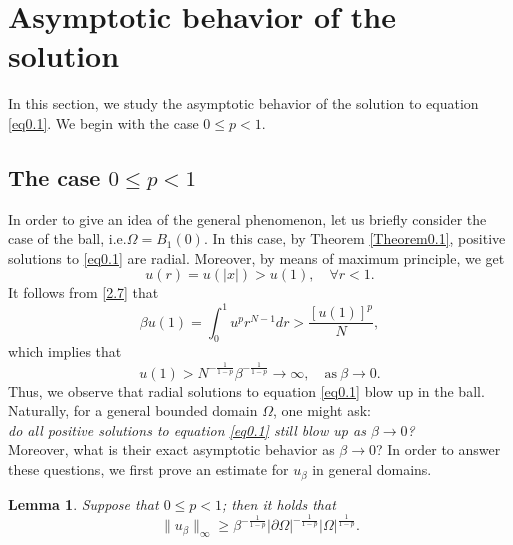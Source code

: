 \documentclass[12pt,reqno]{amsart}
\numberwithin{equation}{section}
\newtheorem{lemma}[theorem]{Lemma}
\theoremstyle{definition}
\begin{document}
\section{Asymptotic behavior of the solution}
In this section, we study the asymptotic behavior of the solution to equation \eqref{eq0.1}. We begin with the case $0\le p<1$.

\subsection{The case $0\le p<1$}



In order to give an idea of the general phenomenon, let us briefly consider the case of the ball, i.e.$\Omega=B_1(0)$. 
 In this case, by Theorem \ref{Theorem0.1},  positive solutions to  \eqref{eq0.1} are  radial. 
Moreover, by means of maximum principle, we get 
$$
u(r)=u(|x|)> u(1),\quad \forall r<1.
$$
It follows from \eqref{2.7} that 
$$
\beta u(1)=\int_{0}^1u^pr^{N-1}dr> \frac{[u(1)]^p}{N},
$$
which implies that 
$$
u(1)> N^{-\frac{1}{1-p}}\beta^{-\frac{1}{1-p}}\to \infty,\quad \text{as}\ \beta\to 0.
$$
Thus, we observe that radial solutions to equation \eqref{eq0.1} blow up in the ball. Naturally, for a general bounded domain $\Omega$, one might ask:\\
{\em do all positive solutions to equation \eqref{eq0.1} still blow up as $\beta\to 0$?}\\
Moreover, what is their exact asymptotic behavior as $\beta\to 0$? In order to answer these questions,  
we first prove an estimate for $u_\beta$ in general domains. 


\begin{lemma}\label{Lemma3.1}
Suppose that $0\leq p<1$; then it holds that 
$$
\|u_\beta\|_\infty\ge \beta^{-\frac{1}{1-p}}|\partial\Omega|^{-\frac{1}{1-p}}|\Omega|^{\frac{1}{1-p}}.
$$
\end{lemma}
\end{document}
